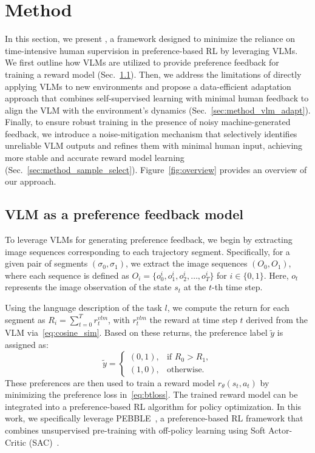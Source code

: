 \section{Method} \label{sec:method}
In this section, we present \algo, a framework designed to minimize the reliance on time-intensive human supervision in preference-based RL by leveraging VLMs. 
We first outline how VLMs are utilized to provide preference feedback for training a reward model (Sec.~\ref{sec:method_vlm_as_pref}). Then, we address the limitations of directly applying VLMs to new environments and propose a data-efficient adaptation approach that combines self-supervised learning with minimal human feedback to align the VLM with the environment's dynamics (Sec.~\ref{sec:method_vlm_adapt}). 
Finally, to ensure robust training in the presence of noisy machine-generated feedback, we introduce a noise-mitigation mechanism that selectively identifies unreliable VLM outputs and refines them with minimal human input, achieving more stable and accurate reward model learning (Sec.~\ref{sec:method_sample_select}). 
Figure~\ref{fig:overview} provides an overview of our approach.



\subsection{VLM as a preference feedback model} \label{sec:method_vlm_as_pref}
To leverage VLMs for generating preference feedback, we begin by extracting image sequences corresponding to each trajectory segment. 
Specifically, for a given pair of segments $(\sigma_0, \sigma_1)$, we extract the image sequences $(O_0, O_1)$, where each sequence is defined as $O_i = \{o^i_0, o^i_1, o^i_2, \dots, o^i_T\}$ for $i \in \{0, 1\}$. 
Here, $o_t$ represents the image observation of the state $s_t$ at the $t$-th time step.

Using the language description of the task $l$, we compute the return for each segment as $R_i = \sum_{t=0}^T r^{vlm}_t$, with $r^{vlm}_t$ the reward at time step $t$ derived from the VLM via~\eqref{eq:cosine_sim}. 
Based on these returns, the preference label $\tilde{y}$ is assigned as: 
\begin{equation} \label{eq:vlm_pref} 
    \tilde{y} = \begin{cases} 
        (0, 1), & \text{if } R_0 > R_1, \\ 
        (1, 0), & \text{otherwise}. 
    \end{cases} 
\end{equation}
These preferences are then used to train a reward model $r_\theta(s_t, a_t)$ by minimizing the preference loss in~\eqref{eq:btloss}. 
The trained reward model can be integrated into a preference-based RL algorithm for policy optimization. 
In this work, we specifically leverage PEBBLE~\cite{lee2021pebble}, a preference-based RL framework that combines unsupervised pre-training with off-policy learning using Soft Actor-Critic (SAC)~\cite{haarnoja2018soft}.


